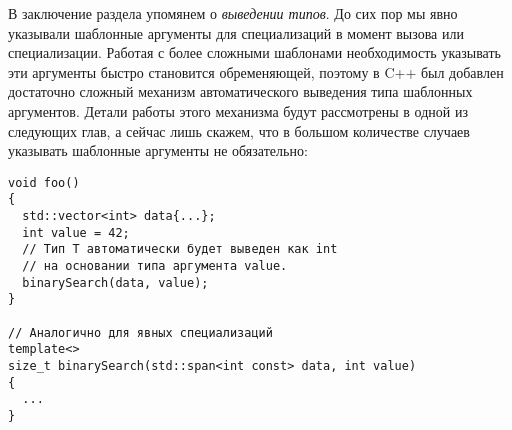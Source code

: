 В заключение раздела упомянем о \textit{выведении типов}.
До сих пор мы явно указывали шаблонные аргументы для специализаций в момент вызова или специализации.
Работая с более сложными шаблонами необходимость указывать эти аргументы быстро становится обременяющей, поэтому в C++ был добавлен достаточно сложный механизм автоматического выведения типа шаблонных аргументов.
Детали работы этого механизма будут рассмотрены в одной из следующих глав, а сейчас лишь скажем, что в большом количестве случаев указывать шаблонные аргументы не обязательно:
\begin{verbatim}
void foo()
{
  std::vector<int> data{...};
  int value = 42;
  // Тип T автоматически будет выведен как int
  // на основании типа аргумента value.
  binarySearch(data, value);
}

// Аналогично для явных специализаций
template<>
size_t binarySearch(std::span<int const> data, int value)
{
  ...
}
\end{verbatim}

